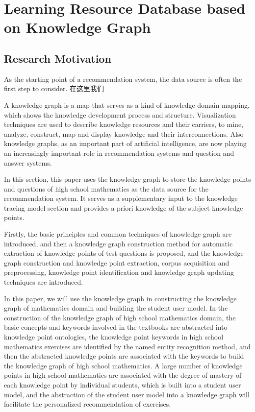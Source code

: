 
\chapter{Learning Resource Database based on Knowledge Graph}

\ifpdf
    \graphicspath{{Chapter2/Figs/Raster/}{Chapter2/Figs/PDF/}{Chapter2/Figs/}}
\else
    \graphicspath{{Chapter2/Figs/Vector/}{Chapter2/Figs/}}
\fi


\section{Research Motivation}
As the starting point of a recommendation system, the data source is often the first step to consider.
在这里我们


A knowledge graph is a map that serves as a kind of knowledge domain mapping, which shows the knowledge development process and structure. Visualization techniques are used to describe knowledge resources and their carriers, to mine, analyze, construct, map and display knowledge and their interconnections. Also knowledge graphs, as an important part of artificial intelligence, are now playing an increasingly important role in recommendation systems and question and answer systems.

In this section, this paper uses the knowledge graph to store the knowledge points and questions of high school mathematics as the data source for the recommendation system. It serves as a supplementary input to the knowledge tracing model section and provides a priori knowledge of the subject knowledge points.

Firstly, the basic principles and common techniques of knowledge graph are introduced, and then a knowledge graph construction method for automatic extraction of knowledge points of test questions is proposed, and the knowledge graph construction and knowledge point extraction, corpus acquisition and preprocessing, knowledge point identification and knowledge graph updating techniques are introduced.

In this paper, we will use the knowledge graph in constructing the knowledge graph of mathematics domain and building the student user model. In the construction of the knowledge graph of high school mathematics domain, the basic concepts and keywords involved in the textbooks are abstracted into knowledge point ontologies, the knowledge point keywords in high school mathematics exercises are identified by the named entity recognition method, and then the abstracted knowledge points are associated with the keywords to build the knowledge graph of high school mathematics. A large number of knowledge points in high school mathematics are associated with the degree of mastery of each knowledge point by individual students, which is built into a student user model, and the abstraction of the student user model into a knowledge graph will facilitate the personalized recommendation of exercises.

